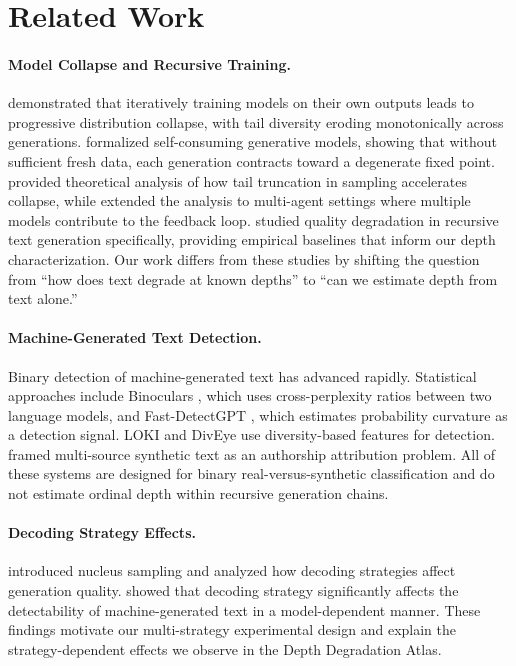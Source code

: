 \documentclass[11pt,a4paper]{article}
\begin{document}
\section{Related Work}

\paragraph{Model Collapse and Recursive Training.}
\citet{shumailov2024ai} demonstrated that iteratively training models on their own outputs leads to progressive distribution collapse, with tail diversity eroding monotonically across generations. \citet{alemohammad2024selfconsuming} formalized self-consuming generative models, showing that without sufficient fresh data, each generation contracts toward a degenerate fixed point. \citet{dohmatob2024tale} provided theoretical analysis of how tail truncation in sampling accelerates collapse, while \citet{gerstgrasser2024model} extended the analysis to multi-agent settings where multiple models contribute to the feedback loop. \citet{drayson2025quality} studied quality degradation in recursive text generation specifically, providing empirical baselines that inform our depth characterization. Our work differs from these studies by shifting the question from ``how does text degrade at known depths'' to ``can we estimate depth from text alone.''

\paragraph{Machine-Generated Text Detection.}
Binary detection of machine-generated text has advanced rapidly. Statistical approaches include Binoculars \citep{hans2024spotting}, which uses cross-perplexity ratios between two language models, and Fast-DetectGPT \citep{bao2024fast}, which estimates probability curvature as a detection signal. LOKI \citep{liu2024loki} and DivEye \citep{he2024diveye} use diversity-based features for detection. \citet{uchendu2020authorship} framed multi-source synthetic text as an authorship attribution problem. All of these systems are designed for binary real-versus-synthetic classification and do not estimate ordinal depth within recursive generation chains.

\paragraph{Decoding Strategy Effects.}
\citet{holtzman2020curious} introduced nucleus sampling and analyzed how decoding strategies affect generation quality. \citet{garces2025decoding} showed that decoding strategy significantly affects the detectability of machine-generated text in a model-dependent manner. These findings motivate our multi-strategy experimental design and explain the strategy-dependent effects we observe in the Depth Degradation Atlas.
\end{document}
